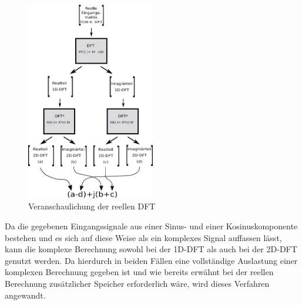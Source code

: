 \begin{figure}[htbp]
 \centering
 \includegraphics[width=0.5\textwidth]{img/reelleMatMult.png}
 \caption{Veranschaulichung der reellen DFT}
 \label{pic:reelleDFT}
\end{figure}




Da die gegebenen Eingangssignale aus einer Sinus- und einer Kosinuskomponente bestehen und es sich auf diese Weise als ein komplexes Signal auffassen lässt, kann die 
komplexe Berechnung sowohl bei der 1D-DFT als auch bei der 2D-DFT genutzt werden. 
Da hierdurch in beiden Fällen eine vollständige Auslastung einer komplexen Berechnung gegeben ist und wie bereits erwähnt bei der reellen Berechnung zusätzlicher Speicher 
erforderlich wäre, wird dieses Verfahren angewandt.



